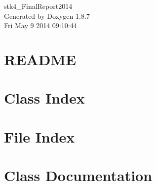 \documentclass[twoside]{book}
\newcommand{\+}{\discretionary{\mbox{\scriptsize$\hookleftarrow$}}{}{}}
\newcommand{\clearemptydoublepage}{%
  \newpage{\pagestyle{empty}\cleardoublepage}%
}
\begin{document}
\hypersetup{pageanchor=false,
             bookmarks=true,
             bookmarksnumbered=true,
             pdfencoding=unicode
            }
\begin{titlepage}
\vspace*{7cm}
\begin{center}%
{\Large stk4\+\_\+\+Final\+Report2014 }\\
\vspace*{1cm}
{\large Generated by Doxygen 1.8.7}\\
\vspace*{0.5cm}
{\small Fri May 9 2014 09:10:44}\\
\end{center}
\end{titlepage}
\clearemptydoublepage
\tableofcontents
\clearemptydoublepage
{}
\hypersetup{pageanchor=true}

\chapter{R\+E\+A\+D\+M\+E}
\label{md__c_1__users__stefan__documents__git_hub__final__project__r_e_a_d_m_e}
\hypertarget{md__c_1__users__stefan__documents__git_hub__final__project__r_e_a_d_m_e}{}

\chapter{Class Index}

\chapter{File Index}

\chapter{Class Documentation}


\end{document}
